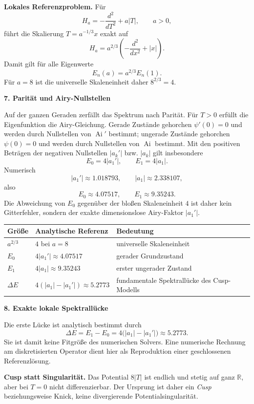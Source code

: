 \documentclass[10pt,a4paper]{article}
\begin{document}
\begin{proofbox}
\textbf{Lokales Referenzproblem.} Für
\[
H_a=-\frac{d^2}{dT^2}+a|T|,\qquad a>0,
\]
führt die Skalierung $T=a^{-1/3}x$ exakt auf
\[
H_a=a^{2/3}\left(-\frac{d^2}{dx^2}+|x|\right).
\]
Damit gilt für alle Eigenwerte
\[
\boxed{E_n(a)=a^{2/3}E_n(1).}
\]
Für $a=8$ ist die universelle Skaleneinheit daher $8^{2/3}=4$.
\end{proofbox}

\textbf{7. Parität und Airy-Nullstellen}

Auf der ganzen Geraden zerfällt das Spektrum nach Parität. Für $T>0$ erfüllt die Eigenfunktion die Airy-Gleichung. Gerade Zustände gehorchen $\psi'(0)=0$ und werden durch Nullstellen von $\operatorname{Ai}'$ bestimmt; ungerade Zustände gehorchen $\psi(0)=0$ und werden durch Nullstellen von $\operatorname{Ai}$ bestimmt. Mit den positiven Beträgen der negativen Nullstellen $|a_k'|$ bzw. $|a_k|$ gilt insbesondere
\[
E_0=4|a_1'|,\qquad E_1=4|a_1|.
\]
Numerisch
\[
|a_1'|\approx1.018793,\qquad |a_1|\approx2.338107,
\]
also
\[
\boxed{E_0\approx4.07517},\qquad
\boxed{E_1\approx9.35243}.
\]
Die Abweichung von $E_0$ gegenüber der bloßen Skaleneinheit $4$ ist daher kein Gitterfehler, sondern der exakte dimensionslose Airy-Faktor $|a_1'|$.

\begin{center}
\small
\begin{tabularx}{\textwidth}{>{\bfseries}p{2.4cm} X X}
\toprule
Größe & Analytische Referenz & Bedeutung\\
\midrule
$a^{2/3}$ & $4$ bei $a=8$ & universelle Skaleneinheit\\
$E_0$ & $4|a_1'|\approx4.07517$ & gerader Grundzustand\\
$E_1$ & $4|a_1|\approx9.35243$ & erster ungerader Zustand\\
$\Delta E$ & $4(|a_1|-|a_1'|)\approx5.2773$ & fundamentale Spektrallücke des Cusp-Modells\\
\bottomrule
\end{tabularx}
\end{center}

\textbf{8. Exakte lokale Spektrallücke}

Die erste Lücke ist analytisch bestimmt durch
\[
\boxed{\Delta E=E_1-E_0=4\bigl(|a_1|-|a_1'|\bigr)\approx5.2773.}
\]
Sie ist damit keine Fitgröße des numerischen Solvers. Eine numerische Rechnung am diskretisierten Operator dient hier als Reproduktion einer geschlossenen Referenzlösung.

\begin{statusbox}
\textbf{Cusp statt Singularität.} Das Potential $8|T|$ ist endlich und stetig auf ganz $\mathbb R$, aber bei $T=0$ nicht differenzierbar. Der Ursprung ist daher ein \emph{Cusp} beziehungsweise Knick, keine divergierende Potentialsingularität.
\end{statusbox}
\end{document}
